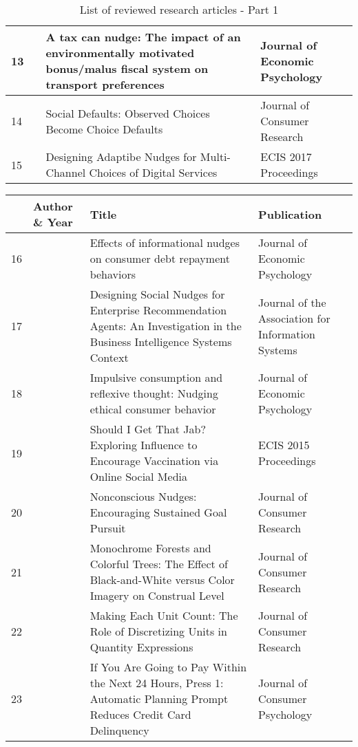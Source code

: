 \begin{table}[h!]
\begin{tabular}{|l|p{}|p{}|p{}|}
13 & \cite{hilton_tax_2014} & A tax can nudge: The impact of an environmentally motivated bonus/malus fiscal system on transport preferences & Journal of Economic Psychology \\ \hline
14 & \cite{huh_social_2014} & Social Defaults: Observed Choices Become Choice Defaults & Journal of Consumer Research \\ \hline
15 & \cite{hummel_designing_2017} & Designing Adaptibe Nudges for Multi-Channel Choices of Digital Services & ECIS 2017 Proceedings \\ \hline
\end{tabular}
\caption{List of reviewed research articles - Part 1}
\label{table:articles}
\end{table}

\newpage

\begin{table}[h!]
\small
\begin{tabular}{|l|p{}|p{}|p{}|}
\hline
 & \textbf{Author \& Year} & \textbf{Title} & \textbf{Publication} \\ \hline
16 & \cite{jones_effects_2015} & Effects of informational nudges on consumer debt repayment behaviors & Journal of Economic Psychology \\ \hline
17 & \cite{kretzer_designing_2018} & Designing Social Nudges for Enterprise Recommendation Agents: An Investigation in the Business Intelligence Systems Context & Journal of the Association for Information Systems \\ \hline
18 & \cite{lades_impulsive_2014} & Impulsive consumption and reflexive thought: Nudging ethical consumer behavior & Journal of Economic Psychology \\ \hline
19 & \cite{langley_should_2015} & Should I Get That Jab? Exploring Influence to Encourage Vaccination via Online Social Media & ECIS 2015 Proceedings \\ \hline
20 & \cite{laran_nonconscious_2018} & Nonconscious Nudges: Encouraging Sustained Goal Pursuit & Journal of Consumer Research \\ \hline
21 & \cite{lee_monochrome_2014} & Monochrome Forests and Colorful Trees: The Effect of Black-and-White versus Color Imagery on Construal Level & Journal of Consumer Research \\ \hline
22 & \cite{lembregts_making_2019} & Making Each Unit Count: The Role of Discretizing Units in Quantity Expressions & Journal of Consumer Research \\ \hline
23 & \cite{mazar_if_2018} & If You Are Going to Pay Within the Next 24 Hours, Press 1: Automatic Planning Prompt Reduces Credit Card Delinquency & Journal of Consumer Psychology \\ \hline

\end{tabular}
\end{table}
